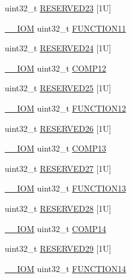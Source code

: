\begin{DoxyCompactItemize}
uint32\+\_\+t \hyperlink{struct_d_w_t___type_ab3261dfc078ae8aaac1b096bda2cc15a}{R\+E\+S\+E\+R\+V\+E\+D23} \mbox{[}1\+U\mbox{]}
\item 
\hyperlink{core__sc300_8h_ab6caba5853a60a17e8e04499b52bf691}{\+\_\+\+\_\+\+I\+OM} uint32\+\_\+t \hyperlink{struct_d_w_t___type_a214f7478184150e43175c05aecad6c96}{F\+U\+N\+C\+T\+I\+O\+N11}
\item 
uint32\+\_\+t \hyperlink{struct_d_w_t___type_a2cc26bd6d706077ca9cd56cc20ff2b9d}{R\+E\+S\+E\+R\+V\+E\+D24} \mbox{[}1\+U\mbox{]}
\item 
\hyperlink{core__sc300_8h_ab6caba5853a60a17e8e04499b52bf691}{\+\_\+\+\_\+\+I\+OM} uint32\+\_\+t \hyperlink{struct_d_w_t___type_a9115fd187d8cbcb9d6ec5eba938b81ea}{C\+O\+M\+P12}
\item 
uint32\+\_\+t \hyperlink{struct_d_w_t___type_a1ff4d863ad093166492d59615592f0e1}{R\+E\+S\+E\+R\+V\+E\+D25} \mbox{[}1\+U\mbox{]}
\item 
\hyperlink{core__sc300_8h_ab6caba5853a60a17e8e04499b52bf691}{\+\_\+\+\_\+\+I\+OM} uint32\+\_\+t \hyperlink{struct_d_w_t___type_a521771b3dfe2ea48463e1e91d01448b6}{F\+U\+N\+C\+T\+I\+O\+N12}
\item 
uint32\+\_\+t \hyperlink{struct_d_w_t___type_a985a01a8b63bcf2f338b3391055f6163}{R\+E\+S\+E\+R\+V\+E\+D26} \mbox{[}1\+U\mbox{]}
\item 
\hyperlink{core__sc300_8h_ab6caba5853a60a17e8e04499b52bf691}{\+\_\+\+\_\+\+I\+OM} uint32\+\_\+t \hyperlink{struct_d_w_t___type_abc29ac14df61ec3f8f3d28ca92892d8a}{C\+O\+M\+P13}
\item 
uint32\+\_\+t \hyperlink{struct_d_w_t___type_a0bb401cc8542799048ba8eecc41d5d97}{R\+E\+S\+E\+R\+V\+E\+D27} \mbox{[}1\+U\mbox{]}
\item 
\hyperlink{core__sc300_8h_ab6caba5853a60a17e8e04499b52bf691}{\+\_\+\+\_\+\+I\+OM} uint32\+\_\+t \hyperlink{struct_d_w_t___type_af9ea0b56769614c5c5699003b3df39f0}{F\+U\+N\+C\+T\+I\+O\+N13}
\item 
uint32\+\_\+t \hyperlink{struct_d_w_t___type_a2b357b17d47a4d526f6b26c6891c21da}{R\+E\+S\+E\+R\+V\+E\+D28} \mbox{[}1\+U\mbox{]}
\item 
\hyperlink{core__sc300_8h_ab6caba5853a60a17e8e04499b52bf691}{\+\_\+\+\_\+\+I\+OM} uint32\+\_\+t \hyperlink{struct_d_w_t___type_a85368a4ec78f4074e5f9cbba92ae1eb9}{C\+O\+M\+P14}
\item 
uint32\+\_\+t \hyperlink{struct_d_w_t___type_af577b10077e677307bb79df1597141ca}{R\+E\+S\+E\+R\+V\+E\+D29} \mbox{[}1\+U\mbox{]}
\item 
\hyperlink{core__sc300_8h_ab6caba5853a60a17e8e04499b52bf691}{\+\_\+\+\_\+\+I\+OM} uint32\+\_\+t \hyperlink{struct_d_w_t___type_a85138a411459f923ea8e05312d70af71}{F\+U\+N\+C\+T\+I\+O\+N14}

\end{DoxyCompactItemize}
